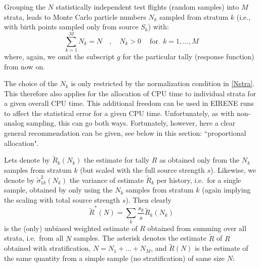 Grouping the $N$ statistically independent test flights (random samples) into
$M$ strata, leads to Monte Carlo particle numbers $N_k$ sampled from stratum
$k$ (i.e., with birth points sampled only from source $S_k$) with:
\begin{equation}
  \label{Nstra}
  \sum_{k=1}^{M}
  N_k = N   \quad, \quad	N_k > 0 ~ \quad \mbox{for}~~ ~ k = 1, \dots, M
\end{equation}
where, again, we omit the subscript $g$ for the particular tally
(response function) from now on.

The choice of the $N_k$ is only restricted by the normalization condition in
\cref{Nstra}.
This therefore also applies for the allocation of CPU time to individual strata
for a given overall CPU time.
This additional freedom can be used in EIRENE runs to affect the statistical
error for a given CPU time.
Unfortunately, as with non-analog sampling, this can go both ways.
Fortunately, however, here a clear general recommendation can be given, see
below in this section: ``proportional allocation".

Lets denote by $\tilde R_k(N_k)$ the estimate for tally $R$ as obtained only
from the $N_k$ samples from stratum $k$ (but scaled with the full source
strength $s$).
Likewise, we denote by $ \tilde \sigma^2_{1k}(N_k)$ the variance of estimate
$\tilde R_k$ per history, i.e.\ for a single sample, obtained by only using the
$N_k$ samples from stratum $k$ (again implying the scaling with total source
strength $s$).
Then clearly
\begin{equation}
  \tilde R^*(N) =\sum_k  \frac {s_k}{s} \tilde
  R_k(N_k)
\end{equation}
is the (only) unbiased weighted estimate of $R$
obtained from summing over all strata, i.e.\ from all $N$ samples.
The asterisk denotes the estimate $\tilde R$ of $R$ obtained with
stratification, $N = N_1+ \dots + N_M$, and $\tilde R(N)$ is the estimate of
the same quantity from a simple sample (no stratification) of same size $N$:

